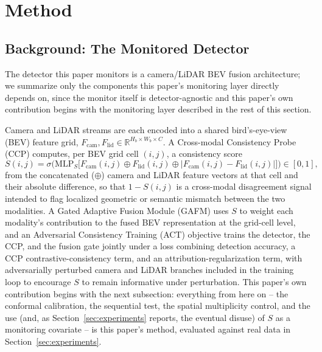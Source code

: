 \section{Method}
\label{sec:method}

\subsection{Background: The Monitored Detector}
\label{sec:background-detector}

The detector this paper monitors is a camera/LiDAR BEV fusion architecture; we summarize only the components this paper's monitoring layer directly depends on, since the monitor itself is detector-agnostic and this paper's own contribution begins with the monitoring layer described in the rest of this section.

Camera and LiDAR streams are each encoded into a shared bird's-eye-view (BEV) feature grid, $F_{\mathrm{cam}}, F_{\mathrm{lid}} \in \mathbb{R}^{H_b \times W_b \times C}$. A Cross-modal Consistency Probe (CCP) computes, per BEV grid cell $(i,j)$, a consistency score
\begin{equation}
S(i,j) = \sigma\Big(\mathrm{MLP}_S\big[F_{\mathrm{cam}}(i,j) \oplus F_{\mathrm{lid}}(i,j) \oplus |F_{\mathrm{cam}}(i,j) - F_{\mathrm{lid}}(i,j)|\big]\Big) \in [0,1],
\label{eq:ccp}
\end{equation}
from the concatenated ($\oplus$) camera and LiDAR feature vectors at that cell and their absolute difference, so that $1 - S(i,j)$ is a cross-modal disagreement signal intended to flag localized geometric or semantic mismatch between the two modalities. A Gated Adaptive Fusion Module (GAFM) uses $S$ to weight each modality's contribution to the fused BEV representation at the grid-cell level, and an Adversarial Consistency Training (ACT) objective trains the detector, the CCP, and the fusion gate jointly under a loss combining detection accuracy, a CCP contrastive-consistency term, and an attribution-regularization term, with adversarially perturbed camera and LiDAR branches included in the training loop to encourage $S$ to remain informative under perturbation. This paper's own contribution begins with the next subsection: everything from here on -- the conformal calibration, the sequential test, the spatial multiplicity control, and the use (and, as Section~\ref{sec:experiments} reports, the eventual disuse) of $S$ as a monitoring covariate -- is this paper's method, evaluated against real data in Section~\ref{sec:experiments}.

